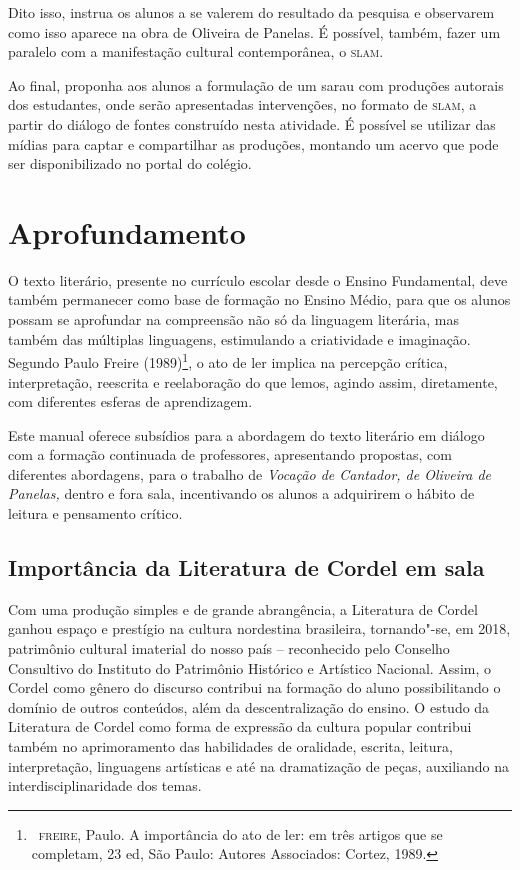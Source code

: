 \documentclass[12pt]{extarticle}
\begin{document}
{Dito isso, instrua os alunos a se valerem do resultado da pesquisa e
observarem como isso aparece na obra de Oliveira de Panelas. É possível,
também, fazer um paralelo com a manifestação cultural contemporânea, o
\textsc{slam}.

Ao final, proponha aos alunos a formulação de um sarau com produções
autorais dos estudantes, onde serão apresentadas intervenções, no
formato de \textsc{slam}, a partir do diálogo de fontes construído nesta
atividade. É possível se utilizar das mídias para captar e compartilhar
as produções, montando um acervo que pode ser disponibilizado no portal
do colégio.

\section{Aprofundamento}

O texto literário, presente no currículo escolar desde o Ensino
Fundamental, deve também permanecer como base de formação no Ensino
Médio, para que os alunos possam se aprofundar na compreensão não só da
linguagem literária, mas também das múltiplas linguagens, estimulando a
criatividade e imaginação. Segundo Paulo Freire (1989)\footnote{~\textsc{freire},
  Paulo. A importância do ato de ler: em três artigos que se completam,
  23 ed, São Paulo: Autores Associados: Cortez, 1989.}, o ato de ler
implica na percepção crítica, interpretação, reescrita e reelaboração do
que lemos, agindo assim, diretamente, com diferentes esferas de
aprendizagem.

Este manual oferece subsídios para a abordagem do texto literário em
diálogo com a formação continuada de professores, apresentando
propostas, com diferentes abordagens, para o trabalho de \emph{Vocação
de Cantador, de Oliveira de Panelas,} dentro e fora sala, incentivando
os alunos a adquirirem o hábito de leitura e pensamento crítico.

\subsection{Importância da Literatura de Cordel em sala}

Com uma produção simples e de grande abrangência, a Literatura de Cordel
ganhou espaço e prestígio na cultura nordestina brasileira, tornando"-se,
em 2018, patrimônio cultural imaterial do nosso país -- reconhecido pelo
Conselho Consultivo do Instituto do Patrimônio Histórico e Artístico
Nacional. Assim, o Cordel como gênero do discurso contribui na formação
do aluno possibilitando o domínio de outros conteúdos, além da
descentralização do ensino. O estudo da Literatura de Cordel como forma
de expressão da cultura popular contribui também no aprimoramento das
habilidades de oralidade, escrita, leitura, interpretação, linguagens
artísticas e até na dramatização de peças, auxiliando na
interdisciplinaridade dos temas.

}
\end{document}
